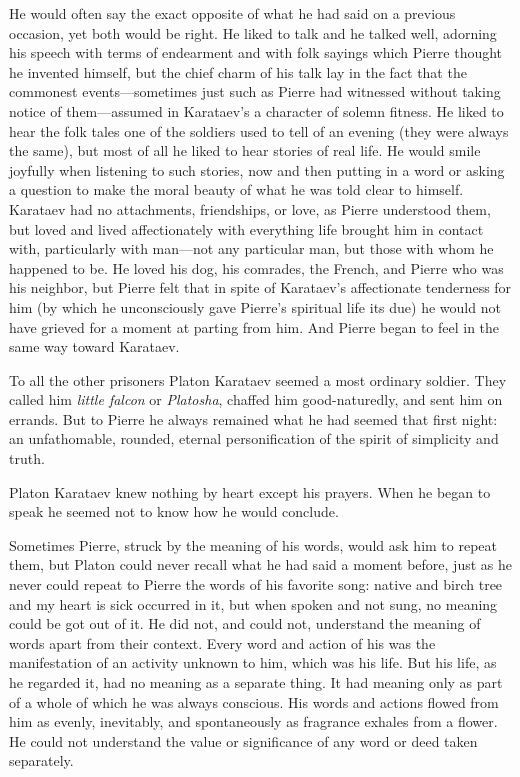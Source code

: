 He would often say the exact opposite of what he had said on a
previous occasion, yet both would be right. He liked to talk and
he talked well, adorning his speech with terms of endearment and
with folk sayings which Pierre thought he invented himself, but
the chief charm of his talk lay in the fact that the commonest
events---sometimes just such as Pierre had witnessed without
taking notice of them---assumed in Karataev's a character of
solemn fitness. He liked to hear the folk tales one of the
soldiers used to tell of an evening (they were always the same),
but most of all he liked to hear stories of real life. He would
smile joyfully when listening to such stories, now and then
putting in a word or asking a question to make the moral beauty
of what he was told clear to himself. Karataev had no
attachments, friendships, or love, as Pierre understood them, but
loved and lived affectionately with everything life brought him
in contact with, particularly with man---not any particular man,
but those with whom he happened to be. He loved his dog, his
comrades, the French, and Pierre who was his neighbor, but Pierre
felt that in spite of Karataev's affectionate tenderness for him
(by which he unconsciously gave Pierre's spiritual life its due)
he would not have grieved for a moment at parting from him. And
Pierre began to feel in the same way toward Karataev.

To all the other prisoners Platon Karataev seemed a most ordinary
soldier. They called him \emph{little falcon} or \emph{Platosha},
chaffed him good-naturedly, and sent him on errands. But to
Pierre he always remained what he had seemed that first night: an
unfathomable, rounded, eternal personification of the spirit of
simplicity and truth.

Platon Karataev knew nothing by heart except his prayers. When he
began to speak he seemed not to know how he would conclude.

Sometimes Pierre, struck by the meaning of his words, would ask
him to repeat them, but Platon could never recall what he had
said a moment before, just as he never could repeat to Pierre the
words of his favorite song: native and birch tree and my heart is
sick occurred in it, but when spoken and not sung, no meaning
could be got out of it. He did not, and could not, understand the
meaning of words apart from their context. Every word and action
of his was the manifestation of an activity unknown to him, which
was his life. But his life, as he regarded it, had no meaning as
a separate thing. It had meaning only as part of a whole of which
he was always conscious. His words and actions flowed from him as
evenly, inevitably, and spontaneously as fragrance exhales from a
flower. He could not understand the value or significance of any
word or deed taken separately.

